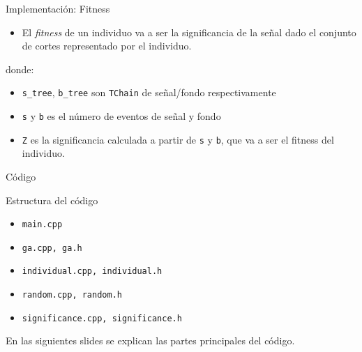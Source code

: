 \documentclass[center,10pt,cm]{beamer}
\begin{document}
\begin{frame}[fragile]{Implementaci\'on: Fitness}

  \begin{itemize}\itemsep0.2cm
  \item El \emph{fitness} de un individuo va a ser la significancia de la se\~nal dado el conjunto de cortes representado por el individuo.
  \end{itemize}

  \scalebox{0.6}{}

  \begin{flushleft}
    donde:
  \end{flushleft}

  \begin{itemize}\itemsep0.2cm
  \item \verb|s_tree|, \verb|b_tree| son \verb|TChain| de se\~nal/fondo respectivamente
  \item \texttt{s} y \texttt{b} es el n\'umero de eventos de se\~nal y fondo
  \item \texttt{Z} es la significancia calculada a partir de \texttt{s} y \texttt{b}, que va a ser el fitness del individuo.
  \end{itemize}

\end{frame}



\begin{frame}[fragile]{C\'odigo}

  \begin{flushleft}
    Estructura del c\'odigo
  \end{flushleft}

    \begin{itemize}\itemsep0.6cm
    \item \texttt{main.cpp}
    \item \texttt{ga.cpp, ga.h}
    \item \texttt{individual.cpp, individual.h}
    \item \texttt{random.cpp, random.h}
    \item \texttt{significance.cpp, significance.h}
    \end{itemize}

    \vspace{0.2cm}

    \begin{flushleft}
      En las siguientes slides se explican las partes principales del c\'odigo.
    \end{flushleft}

\end{frame}
\end{document}
